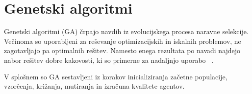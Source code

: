 \documentclass[a4paper,12pt,openright]{book}
\begin{document}
    \section{Genetski algoritmi}\label{sec:genetski-algoritmi}
    Genetski algoritmi (GA) črpajo navdih iz evolucijskega procesa naravne selekcije.
    Večinoma so uporabljeni za reševanje optimizacijskih in iskalnih problemov, ne zagotavljajo pa optimalnih rešitev.
    Namesto enega rezultata po navadi najdejo nabor rešitev dobre kakovosti, ki so primerne za nadaljnjo uporabo
    ~\cite{inteligentni_sistemi_2010,genetic_algorithm_wiki_2022}.
    
    V splošnem so GA sestavljeni iz korakov inicializiranja začetne populacije, vzorčenja, križanja, mutiranja in izračuna kvalitete agentov.
\end{document}
